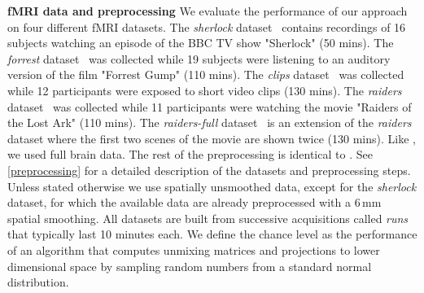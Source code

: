 \documentclass[12pt]{report}
\begin{document}
\textbf{fMRI data and preprocessing} 
We evaluate the performance of our approach on four different fMRI datasets.
%
The \emph{sherlock} dataset~\cite{chen2017shared} contains recordings of 16 subjects watching an episode of the BBC TV show "Sherlock" (50 mins).
%
The \emph{forrest} dataset~\cite{hanke2014high} was collected while 19 subjects were listening to an auditory version of the film "Forrest Gump" (110 mins).
%
The \emph{clips} dataset~\cite{ibc} was collected while 12 participants were exposed to short video clips (130 mins).
%
The \emph{raiders} dataset~\cite{ibc} was collected while 11 participants were watching the movie "Raiders of the Lost Ark" (110 mins).
%
The \emph{raiders-full} dataset~\cite{ibc} is an extension of the \emph{raiders} dataset where the first two scenes of the movie are shown twice (130 mins).
%
Like \cite{zhang2016searchlight}, we used full brain data. The rest of the preprocessing is identical to \cite{chen2017shared}. See \ref{preprocessing} for a detailed description of the datasets and preprocessing steps. Unless stated otherwise we use spatially unsmoothed data, except for the \emph{sherlock} dataset, for which the available data are already preprocessed with a 6\,mm spatial smoothing. All datasets are built from successive acquisitions called \emph{runs} that typically last 10 minutes each.
%
We define the chance level as the performance of an algorithm that computes unmixing matrices and projections to lower dimensional space by sampling random numbers from a standard normal distribution. 
%
\end{document}

